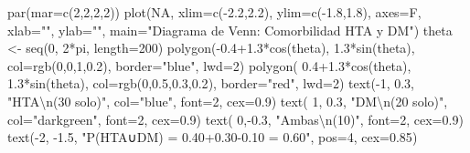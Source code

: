 \documentclass[
  letterpaper,
  DIV=11,
  numbers=noendperiod]{scrartcl}
\newenvironment{Shaded}{\begin{snugshade}}{\end{snugshade}}
\newcommand{\AttributeTok}[1]{\textcolor[rgb]{0.40,0.45,0.13}{#1}}
\newcommand{\ConstantTok}[1]{\textcolor[rgb]{0.56,0.35,0.01}{#1}}
\newcommand{\DecValTok}[1]{\textcolor[rgb]{0.68,0.00,0.00}{#1}}
\newcommand{\FloatTok}[1]{\textcolor[rgb]{0.68,0.00,0.00}{#1}}
\newcommand{\FunctionTok}[1]{\textcolor[rgb]{0.28,0.35,0.67}{#1}}
\newcommand{\NormalTok}[1]{\textcolor[rgb]{0.00,0.23,0.31}{#1}}
\newcommand{\OtherTok}[1]{\textcolor[rgb]{0.00,0.23,0.31}{#1}}
\newcommand{\SpecialCharTok}[1]{\textcolor[rgb]{0.37,0.37,0.37}{#1}}
\newcommand{\StringTok}[1]{\textcolor[rgb]{0.13,0.47,0.30}{#1}}
\begin{document}
\begin{Shaded}
\begin{Highlighting}[]
\FunctionTok{par}\NormalTok{(}\AttributeTok{mar=}\FunctionTok{c}\NormalTok{(}\DecValTok{2}\NormalTok{,}\DecValTok{2}\NormalTok{,}\DecValTok{2}\NormalTok{,}\DecValTok{2}\NormalTok{))}
\FunctionTok{plot}\NormalTok{(}\ConstantTok{NA}\NormalTok{, }\AttributeTok{xlim=}\FunctionTok{c}\NormalTok{(}\SpecialCharTok{{-}}\FloatTok{2.2}\NormalTok{,}\FloatTok{2.2}\NormalTok{), }\AttributeTok{ylim=}\FunctionTok{c}\NormalTok{(}\SpecialCharTok{{-}}\FloatTok{1.8}\NormalTok{,}\FloatTok{1.8}\NormalTok{), }\AttributeTok{axes=}\NormalTok{F, }\AttributeTok{xlab=}\StringTok{""}\NormalTok{, }\AttributeTok{ylab=}\StringTok{""}\NormalTok{,}
     \AttributeTok{main=}\StringTok{"Diagrama de Venn: Comorbilidad HTA y DM"}\NormalTok{)}
\NormalTok{theta }\OtherTok{\textless{}{-}} \FunctionTok{seq}\NormalTok{(}\DecValTok{0}\NormalTok{, }\DecValTok{2}\SpecialCharTok{*}\NormalTok{pi, }\AttributeTok{length=}\DecValTok{200}\NormalTok{)}
\FunctionTok{polygon}\NormalTok{(}\SpecialCharTok{{-}}\FloatTok{0.4+1.3}\SpecialCharTok{*}\FunctionTok{cos}\NormalTok{(theta), }\FloatTok{1.3}\SpecialCharTok{*}\FunctionTok{sin}\NormalTok{(theta), }\AttributeTok{col=}\FunctionTok{rgb}\NormalTok{(}\DecValTok{0}\NormalTok{,}\DecValTok{0}\NormalTok{,}\DecValTok{1}\NormalTok{,}\FloatTok{0.2}\NormalTok{), }\AttributeTok{border=}\StringTok{"blue"}\NormalTok{, }\AttributeTok{lwd=}\DecValTok{2}\NormalTok{)}
\FunctionTok{polygon}\NormalTok{( }\FloatTok{0.4+1.3}\SpecialCharTok{*}\FunctionTok{cos}\NormalTok{(theta), }\FloatTok{1.3}\SpecialCharTok{*}\FunctionTok{sin}\NormalTok{(theta), }\AttributeTok{col=}\FunctionTok{rgb}\NormalTok{(}\DecValTok{0}\NormalTok{,}\FloatTok{0.5}\NormalTok{,}\FloatTok{0.3}\NormalTok{,}\FloatTok{0.2}\NormalTok{), }\AttributeTok{border=}\StringTok{"red"}\NormalTok{, }\AttributeTok{lwd=}\DecValTok{2}\NormalTok{)}
\FunctionTok{text}\NormalTok{(}\SpecialCharTok{{-}}\DecValTok{1}\NormalTok{, }\FloatTok{0.3}\NormalTok{, }\StringTok{"HTA}\SpecialCharTok{\textbackslash{}n}\StringTok{(30 solo)"}\NormalTok{, }\AttributeTok{col=}\StringTok{"blue"}\NormalTok{, }\AttributeTok{font=}\DecValTok{2}\NormalTok{, }\AttributeTok{cex=}\FloatTok{0.9}\NormalTok{)}
\FunctionTok{text}\NormalTok{( }\DecValTok{1}\NormalTok{, }\FloatTok{0.3}\NormalTok{, }\StringTok{"DM}\SpecialCharTok{\textbackslash{}n}\StringTok{(20 solo)"}\NormalTok{, }\AttributeTok{col=}\StringTok{"darkgreen"}\NormalTok{, }\AttributeTok{font=}\DecValTok{2}\NormalTok{, }\AttributeTok{cex=}\FloatTok{0.9}\NormalTok{)}
\FunctionTok{text}\NormalTok{( }\DecValTok{0}\NormalTok{,}\SpecialCharTok{{-}}\FloatTok{0.3}\NormalTok{, }\StringTok{"Ambas}\SpecialCharTok{\textbackslash{}n}\StringTok{(10)"}\NormalTok{, }\AttributeTok{font=}\DecValTok{2}\NormalTok{, }\AttributeTok{cex=}\FloatTok{0.9}\NormalTok{)}
\FunctionTok{text}\NormalTok{(}\SpecialCharTok{{-}}\DecValTok{2}\NormalTok{, }\SpecialCharTok{{-}}\FloatTok{1.5}\NormalTok{, }\StringTok{"P(HTA∪DM) = 0.40+0.30{-}0.10 = 0.60"}\NormalTok{, }\AttributeTok{pos=}\DecValTok{4}\NormalTok{, }\AttributeTok{cex=}\FloatTok{0.85}\NormalTok{)}
\end{Highlighting}
\end{Shaded}
\end{document}
